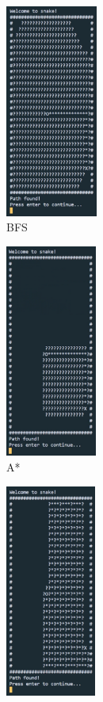 \documentclass[11pt]{article}
\begin{document}
\begin{figure}[H]
\centering
\begin{subfigure}{0.24\textwidth}
    \includegraphics[height=7cm]{BFS_Path_found} 
    \caption{BFS}
    \label{fig:subim1}
\end{subfigure}
\begin{subfigure}{0.24\textwidth}
    \includegraphics[height=7cm]{A_Star_Path_Found}
    \caption{A*}
    \label{fig:subim2}
\end{subfigure}
\begin{subfigure}{0.24\textwidth}
    \includegraphics[height=7cm]{DFS_Path_Found}

\end{subfigure}
\end{figure}
\end{document}
